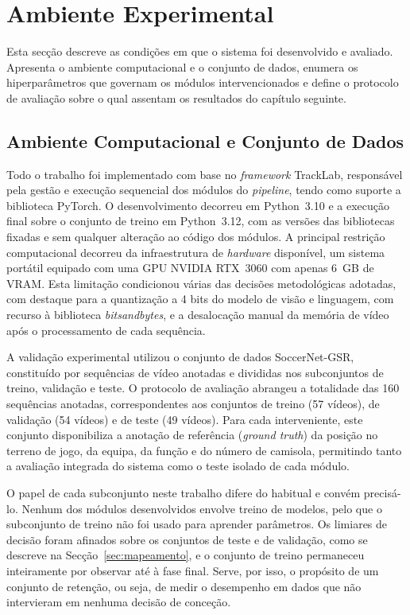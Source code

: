 \section{Ambiente Experimental}

Esta secção descreve as condições em que o sistema foi desenvolvido e avaliado. Apresenta o ambiente
computacional e o conjunto de dados, enumera os hiperparâmetros que governam os módulos
intervencionados e define o protocolo de avaliação sobre o qual assentam os resultados do capítulo
seguinte.

\subsection{Ambiente Computacional e Conjunto de Dados}

Todo o trabalho foi implementado com base no \emph{framework} TrackLab, responsável pela gestão e
execução sequencial dos módulos do \emph{pipeline}, tendo como suporte a biblioteca PyTorch. O
desenvolvimento decorreu em Python~3.10 e a execução final sobre o conjunto de treino em
Python~3.12, com as versões das bibliotecas fixadas e sem qualquer alteração ao código dos módulos.
A principal restrição computacional decorreu da infraestrutura de \emph{hardware}
disponível, um sistema portátil equipado com uma GPU NVIDIA RTX~3060 com apenas 6~GB de VRAM. Esta
limitação condicionou várias das decisões metodológicas adotadas, com destaque para a quantização a
4 bits do modelo de visão e linguagem, com recurso à biblioteca \emph{bitsandbytes}, e a desalocação
manual da memória de vídeo após o processamento de cada sequência.

A validação experimental utilizou o conjunto de dados SoccerNet-GSR, constituído por
sequências de vídeo anotadas e divididas nos subconjuntos de treino, validação e teste.
O protocolo de avaliação abrangeu a totalidade das 160 sequências anotadas,
correspondentes aos conjuntos de treino (57 vídeos), de validação (54 vídeos) e de teste
(49 vídeos). Para cada interveniente, este conjunto disponibiliza a anotação de
referência (\emph{ground truth}) da posição no terreno de jogo, da equipa, da função e do
número de camisola, permitindo tanto a avaliação integrada do sistema como o teste
isolado de cada módulo.

O papel de cada subconjunto neste trabalho difere do habitual e convém precisá-lo. Nenhum dos
módulos desenvolvidos envolve treino de modelos, pelo que o subconjunto de treino não foi usado
para aprender parâmetros. Os limiares de decisão foram afinados sobre os conjuntos de teste e de
validação, como se descreve na Secção~\ref{sec:mapeamento}, e o conjunto de treino permaneceu
inteiramente por observar até à fase final. Serve, por isso, o propósito de um conjunto de
retenção, ou seja, de medir o desempenho em dados que não intervieram em nenhuma decisão de
conceção.


